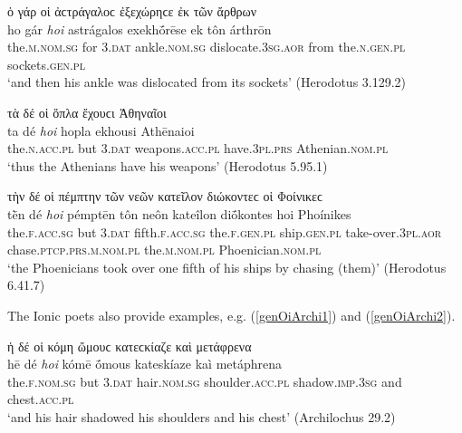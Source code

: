 \begin{exe}
\ex ὁ γάρ {οἱ} ἀϲτράγαλοϲ ἐξεχώρηϲε ἐκ τῶν ἄρθρων\\
\gll ho gár \emph{hoi} astrágalos exekhṓrēse ek tôn árthrōn\\
the.\textsc{m.nom.sg} for \textsc{3.dat} ankle.\textsc{nom.sg} dislocate.\textsc{3sg.aor} from the.\textsc{n.gen.pl} sockets.\textsc{gen.pl}\\
\trans `and then his ankle was dislocated from its sockets' (Herodotus 3.129.2)
\label{genOiIoun3}
\end{exe}

\begin{exe}
\ex τὰ δέ {οἱ} ὅπλα ἔχουϲι Ἀθηναῖοι\\
\gll ta dé \emph{hoi} hopla ekhousi Athēnaioi\\
the.\textsc{n.acc.pl} but \textsc{3.dat} weapons.\textsc{acc.pl} have.\textsc{3pl.prs} Athenian.\textsc{nom.pl}\\
\trans `thus the Athenians have his weapons' (Herodotus 5.95.1)
\label{genOiIoun4}
\end{exe}

\begin{exe}
\ex τὴν δέ {οἱ} πέμπτην τῶν νεῶν κατεῖλον διώκοντεϲ οἱ Φοίνικεϲ\\
\gll tḕn dé \emph{hoi} pémptēn tôn neôn kateîlon diṓkontes hoi Phoínikes\\
the.\textsc{f.acc.sg} but \textsc{3.dat} fifth.\textsc{f.acc.sg} the.\textsc{f.gen.pl} ship.\textsc{gen.pl} take-over.\textsc{3pl.aor} chase.\textsc{ptcp.prs.m.nom.pl} the.\textsc{m.nom.pl} Phoenician.\textsc{nom.pl}\\
\trans `the Phoenicians took over one fifth of his ships by chasing (them)' (Herodotus 6.41.7)
\label{genOiIoun5}
\end{exe}

The Ionic poets also provide examples, e.g. (\ref{genOiArchi1}) and (\ref{genOiArchi2}).

\begin{exe}
\ex ἡ δέ {οἱ} κόμη ὤμουϲ κατεϲκίαζε καὶ μετάφρενα\\
\gll hē dé \emph{hoi} kómē ṓmous kateskíaze kaì metáphrena\\
the.\textsc{f.nom.sg} but \textsc{3.dat} hair.\textsc{nom.sg} shoulder.\textsc{acc.pl} shadow.\textsc{imp.3sg} and chest.\textsc{acc.pl}\\
\trans `and his hair shadowed his shoulders and his chest' (Archilochus 29.2)
\label{genOiArchi1}
\end{exe}

